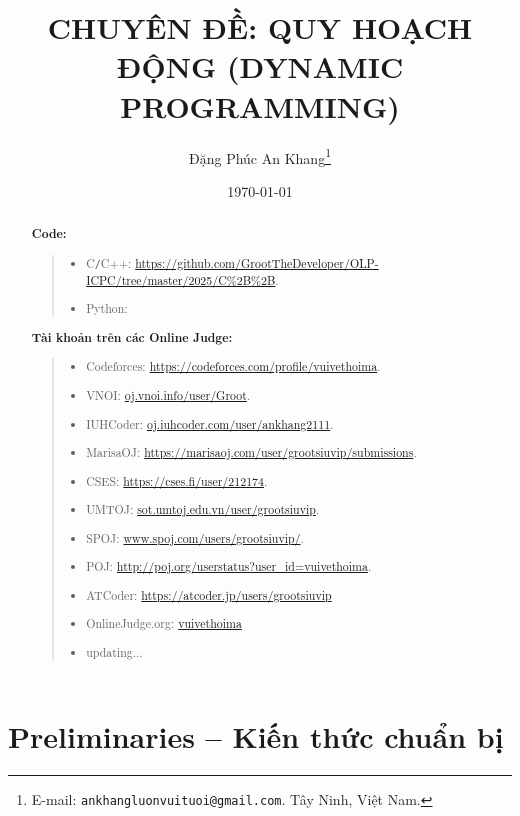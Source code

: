 \documentclass{article}
\title{CHUYÊN ĐỀ: QUY HOẠCH ĐỘNG (DYNAMIC PROGRAMMING)}
\author{Đặng Phúc An Khang\footnote{ E-mail: {\tt ankhangluonvuituoi@gmail.com}. Tây Ninh, Việt Nam.}}
\date{\today}
\begin{document}
\maketitle
\begin{abstract}
	
	
	\textbf{Code:}
	\begin{quote}
		\begin{itemize}
			\item C{\tt/}C++: \url{https://github.com/GrootTheDeveloper/OLP-ICPC/tree/master/2025/C%2B%2B}.
			\item Python: \url{}\\
		\end{itemize}
	\end{quote}
	
	\textbf{Tài khoản trên các Online Judge:}
	\begin{quote}
    	\begin{itemize}
			\item Codeforces: \url{https://codeforces.com/profile/vuivethoima}.
			\item VNOI: \url{oj.vnoi.info/user/Groot}.
			\item IUHCoder: \url{oj.iuhcoder.com/user/ankhang2111}.
			\item MarisaOJ: \url{https://marisaoj.com/user/grootsiuvip/submissions}.
			\item CSES: \url{https://cses.fi/user/212174}.
			\item UMTOJ: \url{sot.umtoj.edu.vn/user/grootsiuvip}.
			\item SPOJ: \url{www.spoj.com/users/grootsiuvip/}.
			\item POJ: \url{http://poj.org/userstatus?user_id=vuivethoima}.
			\item ATCoder: \url{https://atcoder.jp/users/grootsiuvip}
			\item OnlineJudge.org: \url{vuivethoima}
			\item updating...
		\end{itemize}
	\end{quote}
    
\end{abstract}
\tableofcontents


\section{Preliminaries -- Kiến thức chuẩn bị}
\end{document}
